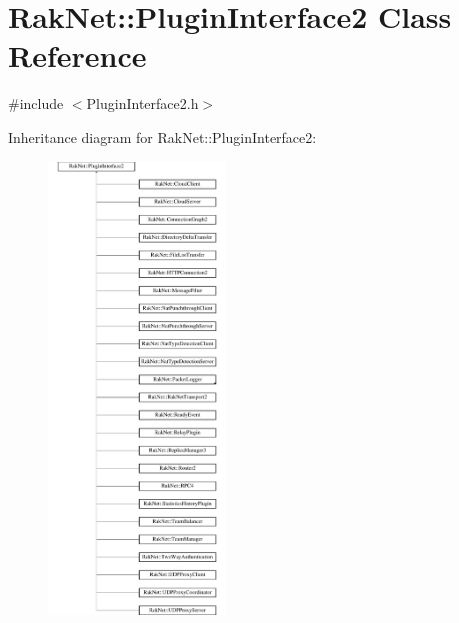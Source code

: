 \hypertarget{class_rak_net_1_1_plugin_interface2}{\section{Rak\-Net\-:\-:Plugin\-Interface2 Class Reference}
\label{class_rak_net_1_1_plugin_interface2}
}


{\ttfamily \#include $<$Plugin\-Interface2.\-h$>$}

Inheritance diagram for Rak\-Net\-:\-:Plugin\-Interface2\-:\begin{figure}[H]
\begin{center}
\leavevmode
\includegraphics[height=12.000000cm]{class_rak_net_1_1_plugin_interface2}
\end{center}
\end{figure}
